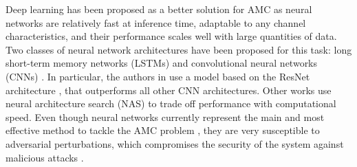 \documentclass[conference]{IEEEtran}
\newcommand{\pf}[1]{{\textcolor{orange}{PF: {#1}}}}
\begin{document}
Deep learning \cite{goodfellow2016deep} has been proposed as a better solution for AMC as neural networks are relatively fast at inference time, adaptable to any channel characteristics, and their performance scales well with large quantities of data. Two classes of neural network architectures have been proposed for this task: long short-term memory networks (LSTMs) \cite{Rajendran_Meert_Giustiniano_Lenders_Pollin_2018,Guo_Jiang_Wu_Zhou_2020} and convolutional neural networks (CNNs) \cite{OShea_Corgan_Clancy_2016,West_OShea_2017,Sadeghi_Larsson_2019}. In particular, the authors in \cite{OShea_Roy_Clancy_2018} use a model based on the ResNet architecture \cite{Szegedy_Ioffe_Vanhoucke_Alemi_2016}, that outperforms all other CNN architectures. Other works use neural architecture search (NAS) \cite{ahmadi2008modulation,dai2019multi,perenda2021evolutionary} to trade off performance with computational speed. Even though neural networks currently represent the main and most effective method to tackle the AMC problem \cite{OShea_Roy_Clancy_2018}, they are very susceptible to adversarial perturbations, which compromises the security of the system against malicious attacks  \cite{Szegedy_Zaremba_Sutskever_Bruna_Erhan_Goodfellow_Fergus_2014, moosavi2017universal,Sadeghi_Larsson_2019,Lin_Zhao_2020,Flowers_Buehrer_Headley_2019, maroto2021benefits}. 

\end{document}
